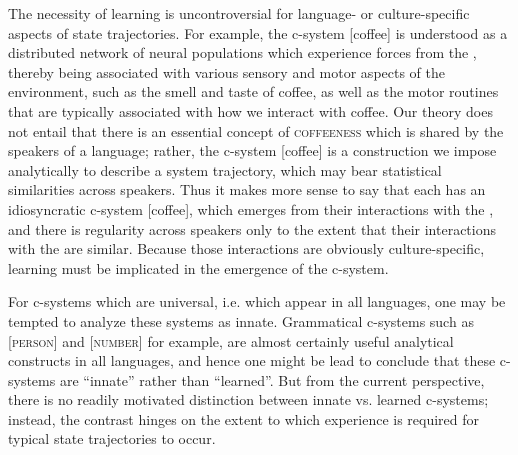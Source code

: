 The necessity of learning is uncontroversial for language- or culture-specific aspects of state trajectories. For example, the c-system [coffee] is understood as a distributed network of neural populations which experience forces from the  , thereby being associated with various sensory and motor aspects of the environment, such as the smell and taste of coffee, as well as the motor routines that are typically associated with how we interact with coffee. Our theory does not entail that there is an essential concept of \textsc{coffeeness} which is shared by the speakers of a language; rather, the c-system [coffee] is a construction we impose analytically to describe a system trajectory, which may bear statistical similarities across speakers. Thus it makes more sense to say that each  has an idiosyncratic c-system [coffee], which emerges from their interactions with the , and there is regularity across speakers only to the extent that their interactions with the  are similar. Because those interactions are obviously culture-specific, learning must be implicated in the emergence of the c-system.

For c-systems which are universal, i.e. which appear in all languages, one may be tempted to analyze these systems as innate. Grammatical c-systems such as [\textsc{person}] and [\textsc{number}] for example, are almost certainly useful analytical constructs in all languages, and hence one might be lead to conclude that these c-systems are “innate” rather than “learned”. But from the current perspective, there is no readily motivated distinction between innate vs. learned c-systems; instead, the contrast hinges on the extent to which experience is required for typical state trajectories to occur. 

